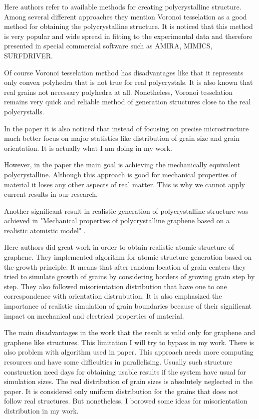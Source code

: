 \documentclass{article}
\begin{document}
Here authors refer to available methods for creating polycrystalline structure. Among several different approaches they mention Voronoi tesselation as a good method for obtaining the polycrystalline structure. It is noticed that this method is very popular and wide spread in fitting to the experimental data and therefore presented in special commercial software such as AMIRA, MIMICS, SURFDRIVER.

Of course Voronoi tesselation method has disadvantages like that it represents only convex polyhedra that is not true for real polycrystals. It is also known that real grains not necessary polyhedra at all. Nonetheless, Voronoi tesselation remains very quick and reliable method of generation structures close to the real polycrystalls. 

In the paper it is also noticed that instead of focusing on precise microstructure much better focus on major statistics like  distribution of grain size and grain orientation. It is actually what I am doing in my work.

However, in the paper the main goal is achieving the mechanically equivalent polycrystalline. Although this approach is good for mechanical properties of material it loses any other aspects of real matter. This is why we cannot apply current results in our research.

Another significant result in realistic generation of polycrystalline structure was achieved in "Mechanical properties of polycrystalline graphene based on a realistic atomistic model" \cite{kotak12}.

Here authors did great work in order to obtain realistic atomic structure of graphene. They implemented algorithm for atomic structure generation based on the growth principle. It means that after random location of grain centers they tried to simulate growth of grains by considering borders of growing grain step by step. They also followed misorientation distribution that have one to one correspondence with orientation distrubution. It is also emphasized the importance of realistic simulation of grain boundaries because of their significant impact on mechanical and electrical properties of material.

The main disadvantages in the work that the result is valid only for graphene and graphene like structures. This limitation I will try to bypass in my work. There is also problem with algorithm used in paper. This approach needs more computing resources and have some difficulties in parallelising. Usually such structure construction need days for obtaining usable results if the system have usual for simulation sizes. The real distribution of grain sizes is absolutely neglected in the paper. It is considered only uniform distribution for the grains that does not follow real structures. But nonetheless, I borowed some ideas for misorientation distribution in my work.
\end{document}
